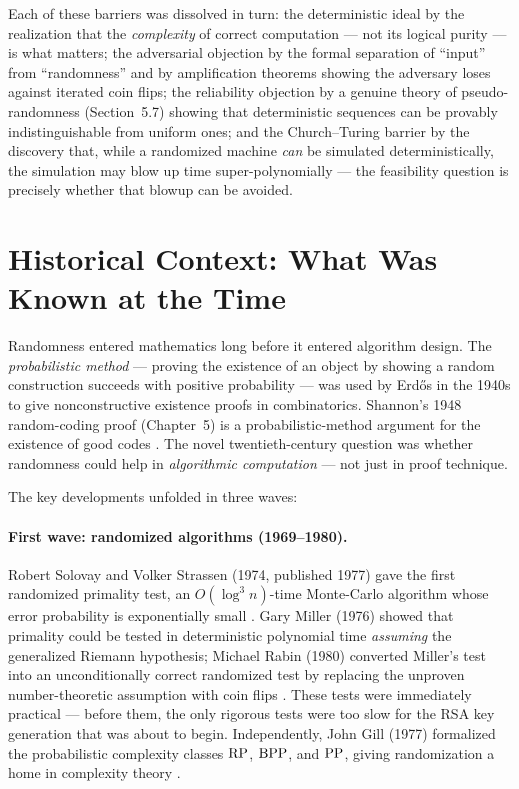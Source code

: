 Each of these barriers was dissolved in turn: the deterministic ideal by the realization that the \emph{complexity} of correct computation --- not its logical purity --- is what matters; the adversarial objection by the formal separation of ``input'' from ``randomness'' and by amplification theorems showing the adversary loses against iterated coin flips; the reliability objection by a genuine theory of pseudo-randomness (Section~5.7) showing that deterministic sequences can be provably indistinguishable from uniform ones; and the Church--Turing barrier by the discovery that, while a randomized machine \emph{can} be simulated deterministically, the simulation may blow up time super-polynomially --- the feasibility question is precisely whether that blowup can be avoided.

\section{Historical Context: What Was Known at the Time}
\label{sec:randomized:context}

Randomness entered mathematics long before it entered algorithm design. The \emph{probabilistic method} --- proving the existence of an object by showing a random construction succeeds with positive probability --- was used by Erd\H{o}s in the 1940s to give nonconstructive existence proofs in combinatorics. Shannon's 1948 random-coding proof (Chapter~5) is a probabilistic-method argument for the existence of good codes \cite{Shannon1948}. The novel twentieth-century question was whether randomness could help in \emph{algorithmic computation} --- not just in proof technique.

The key developments unfolded in three waves:

\paragraph{First wave: randomized algorithms (1969--1980).} Robert Solovay and Volker Strassen (1974, published 1977) gave the first randomized primality test, an $O(\log^3 n)$-time Monte-Carlo algorithm whose error probability is exponentially small \cite{SolovayStrassen1977}. Gary Miller (1976) showed that primality could be tested in deterministic polynomial time \emph{assuming} the generalized Riemann hypothesis; Michael Rabin (1980) converted Miller's test into an unconditionally correct randomized test by replacing the unproven number-theoretic assumption with coin flips \cite{rabin1983,Miller1985}. These tests were immediately practical --- before them, the only rigorous tests were too slow for the RSA key generation that was about to begin. Independently, John Gill (1977) formalized the probabilistic complexity classes $\text{RP}$, $\text{BPP}$, and $\text{PP}$, giving randomization a home in complexity theory \cite{gill1977}.

